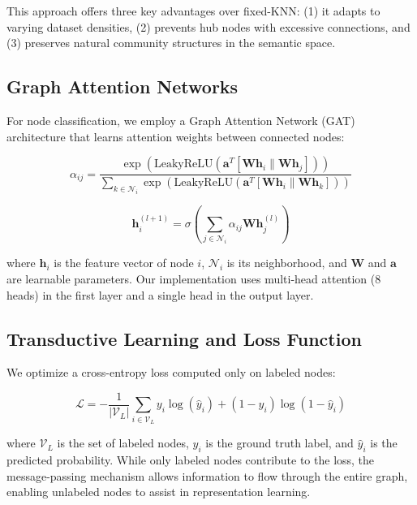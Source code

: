 \documentclass[conference]{IEEEtran}
\begin{document}
This approach offers three key advantages over fixed-KNN: (1) it adapts to varying dataset densities, (2) prevents hub nodes with excessive connections, and (3) preserves natural community structures in the semantic space.

\subsection{Graph Attention Networks}
For node classification, we employ a Graph Attention Network (GAT) architecture \cite{velivckovic2017graph} that learns attention weights between connected nodes:

\begin{equation}
    \alpha_{ij} = \frac{\exp(\text{LeakyReLU}(\mathbf{a}^T[\mathbf{W}\mathbf{h}_i\|\mathbf{W}\mathbf{h}_j]))}{\sum_{k\in\mathcal{N}_i}\exp(\text{LeakyReLU}(\mathbf{a}^T[\mathbf{W}\mathbf{h}_i\|\mathbf{W}\mathbf{h}_k]))}
\end{equation}

\begin{equation}
    \mathbf{h}_i^{(l+1)} = \sigma\left(\sum_{j\in\mathcal{N}_i}\alpha_{ij}\mathbf{W}\mathbf{h}_j^{(l)}\right)
\end{equation}

where $\mathbf{h}_i$ is the feature vector of node $i$, $\mathcal{N}_i$ is its neighborhood, and $\mathbf{W}$ and $\mathbf{a}$ are learnable parameters. Our implementation uses multi-head attention (8 heads) in the first layer and a single head in the output layer.

\subsection{Transductive Learning and Loss Function}
We optimize a cross-entropy loss computed only on labeled nodes:

\begin{equation}
    \mathcal{L} = -\frac{1}{|\mathcal{V}_L|}\sum_{i\in\mathcal{V}_L}y_i\log(\hat{y}_i) + (1-y_i)\log(1-\hat{y}_i)
\end{equation}

where $\mathcal{V}_L$ is the set of labeled nodes, $y_i$ is the ground truth label, and $\hat{y}_i$ is the predicted probability. While only labeled nodes contribute to the loss, the message-passing mechanism allows information to flow through the entire graph, enabling unlabeled nodes to assist in representation learning.
\end{document}
